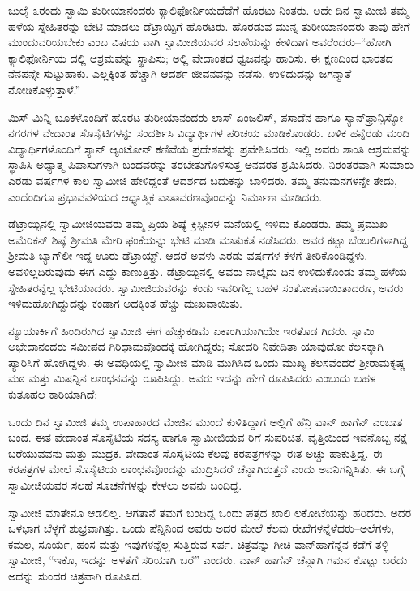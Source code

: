 ಜುಲೈ ೩ರಂದು ಸ್ವಾಮಿ ತುರೀಯಾನಂದರು ಕ್ಯಾಲಿಫೋರ್ನಿಯದೆಡೆಗೆ ಹೊರಟು ನಿಂತರು. ಅದೇ ದಿನ ಸ್ವಾಮೀಜಿ ತಮ್ಮ ಹಳೆಯ ಸ್ನೇಹಿತರನ್ನು ಭೇಟಿ ಮಾಡಲು ಡೆಟ್ರಾಯ್ಟಿಗೆ ಹೊರಟರು. ಹೊರಡುವ ಮುನ್ನ ತುರೀಯಾನಂದರು ತಾವು ಹೇಗೆ ಮುಂದುವರಿಯಬೇಕು ಎಂಬ ವಿಷಯ ವಾಗಿ ಸ್ವಾಮೀಜಿಯವರ ಸಲಹೆಯನ್ನು ಕೇಳಿದಾಗ ಅವರೆಂದರು–“ಹೋಗಿ ಕ್ಯಾಲಿಫೋರ್ನಿಯ ದಲ್ಲಿ ಆಶ್ರಮವನ್ನು ಸ್ಥಾಪಿಸು; ಅಲ್ಲಿ ವೇದಾಂತದ ಧ್ವಜವನ್ನು ಹಾರಿಸು. ಈ ಕ್ಷಣದಿಂದ ಭಾರತದ ನೆನಪನ್ನೇ ಸುಟ್ಟುಹಾಕು. ಎಲ್ಲಕ್ಕಿಂತ ಹೆಚ್ಚಾಗಿ ಆದರ್ಶ ಜೀವನವನ್ನು ನಡೆಸು. ಉಳಿದುದನ್ನು ಜಗನ್ಮಾತೆ ನೋಡಿಕೊಳ್ಳುತ್ತಾಳೆ.”

ಮಿಸ್ ಮಿನ್ನಿ ಬೂಕಳೊಂದಿಗೆ ಹೊರಟ ತುರೀಯಾನಂದರು ಲಾಸ್ ಏಂಜಲಿಸ್, ಪಸಾಡೆನ ಹಾಗೂ ಸ್ಯಾನ್​ಫ್ರಾನ್ಸಿಸ್ಕೋ ನಗರಗಳ ವೇದಾಂತ ಸೊಸೈಟಿಗಳನ್ನು ಸಂದರ್ಶಿಸಿ ವಿದ್ಯಾರ್ಥಿಗಳ ಪರಿಚಯ ಮಾಡಿಕೊಂಡರು. ಬಳಿಕ ಹನ್ನೆರಡು ಮಂದಿ ವಿದ್ಯಾರ್ಥಿಗಳೊಂದಿಗೆ ಸ್ಯಾನ್ ಆ್ಯಂಟೋನ್ ಕಣಿವೆಯ ಪ್ರದೇಶವನ್ನು ಪ್ರವೇಶಿಸಿದರು. ಇಲ್ಲಿ ಅವರು ಶಾಂತಿ ಆಶ್ರಮವನ್ನು ಸ್ಥಾಪಿಸಿ ಅಧ್ಯಾತ್ಮ ಪಿಪಾಸುಗಳಾಗಿ ಬಂದವರನ್ನು ತರಬೇತುಗೊಳಿಸುತ್ತ ಅನವರತ ಶ್ರಮಿಸಿದರು. ನಿರಂತರವಾಗಿ ಸುಮಾರು ಎರಡು ವರ್ಷಗಳ ಕಾಲ ಸ್ವಾಮೀಜಿ ಹೇಳಿದ್ದಂತೆ ಆದರ್ಶದ ಬದುಕನ್ನು ಬಾಳಿದರು. ತಮ್ಮ ತನುಮನಗಳನ್ನೇ ತೇದು, ಎಂದೆಂದಿಗೂ ಪ್ರಭಾವವಳಿಯದ ಆಧ್ಯಾತ್ಮಿಕ ವಾತಾವರಣವೊಂದನ್ನು ನಿರ್ಮಾಣ ಮಾಡಿದರು.

ಡೆಟ್ರಾಯ್ಟಿನಲ್ಲಿ ಸ್ವಾಮೀಜಿಯವರು ತಮ್ಮ ಪ್ರಿಯ ಶಿಷ್ಯೆ ಕ್ರಿಸ್ಟೀನಳ ಮನೆಯಲ್ಲಿ ಇಳಿದು ಕೊಂಡರು. ತಮ್ಮ ಪ್ರಮುಖ ಅಮೆರಿಕನ್ ಶಿಷ್ಯೆ ಶ್ರೀಮತಿ ಮೇರಿ ಫಂಕೆಯನ್ನು ಭೇಟಿ ಮಾಡಿ ಮಾತುಕತೆ ನಡೆಸಿದರು. ಅವರ ಕಟ್ಟಾ ಬೆಂಬಲಿಗಳಾಗಿದ್ದ ಶ್ರೀಮತಿ ಬ್ಯಾಗ್​ಲೀ ಇದ್ದ ಊರು ಡೆಟ್ರಾಯ್ಟ್. ಆದರೆ ಅವಳು ಎರಡು ವರ್ಷಗಳ ಕೆಳಗೆ ತೀರಿಕೊಂಡಿದ್ದಳು. ಅವಳಿಲ್ಲದಿರುವುದು ಈಗ ಎದ್ದು ಕಾಣುತ್ತಿತ್ತು. ಡೆಟ್ರಾಯ್ಟಿನಲ್ಲಿ ಅವರು ನಾಲ್ಕೈದು ದಿನ ಉಳಿದುಕೊಂಡು ತಮ್ಮ ಹಳೆಯ ಸ್ನೇಹಿತರನ್ನೆಲ್ಲ ಭೇಟಿಯಾದರು. ಸ್ವಾಮೀಜಿಯವರನ್ನು ಕಂಡು ಇವರಿಗೆಲ್ಲ ಬಹಳ ಸಂತೋಷವಾಯಿತಾದರೂ, ಅವರು ಇಳಿದುಹೋಗಿದ್ದುದನ್ನು ಕಂಡಾಗ ಅದಕ್ಕಿಂತ ಹೆಚ್ಚು ದುಃಖವಾಯಿತು.

ನ್ಯೂಯಾರ್ಕಿಗೆ ಹಿಂದಿರುಗಿದ ಸ್ವಾಮೀಜಿ ಈಗ ಹೆಚ್ಚುಕಡಿಮೆ ಏಕಾಂಗಿಯಾಗಿಯೇ ಇರತೊಡ ಗಿದರು. ಸ್ವಾಮಿ ಅಭೇದಾನಂದರು ಸಮೀಪದ ಗಿರಿಧಾಮವೊಂದಕ್ಕೆ ಹೋಗಿದ್ದರು; ಸೋದರಿ ನಿವೇದಿತಾ ಯಾವುದೋ ಕೆಲಸಕ್ಕಾಗಿ ಪ್ಯಾರಿಸಿಗೆ ಹೋಗಿದ್ದಳು. ಈ ಅವಧಿಯಲ್ಲಿ ಸ್ವಾಮೀಜಿ ಮಾಡಿ ಮುಗಿಸಿದ ಒಂದು ಮುಖ್ಯ ಕೆಲಸವೆಂದರೆ ಶ್ರೀರಾಮಕೃಷ್ಣ ಮಠ ಮತ್ತು ಮಿಷನ್ನಿನ ಲಾಂಛನವನ್ನು ರೂಪಿಸಿದ್ದು. ಅವರು ಇದನ್ನು ಹೇಗೆ ರೂಪಿಸಿದರು ಎಂಬುದು ಬಹಳ ಕುತೂಹಲ ಕಾರಿಯಾಗಿದೆ:

ಒಂದು ದಿನ ಸ್ವಾಮೀಜಿ ತಮ್ಮ ಉಪಾಹಾರದ ಮೇಜಿನ ಮುಂದೆ ಕುಳಿತಿದ್ದಾಗ ಅಲ್ಲಿಗೆ ಹೆನ್ರಿ ವಾನ್ ಹಾಗೆನ್ ಎಂಬಾತ ಬಂದ. ಈತ ವೇದಾಂತ ಸೊಸೈಟಿಯ ಸದಸ್ಯ ಹಾಗೂ ಸ್ವಾಮೀಜಿಯವ ರಿಗೆ ಸುಪರಿಚಿತ. ವೃತ್ತಿಯಿಂದ ಇವನೊಬ್ಬ ನಕ್ಷೆ ಬರೆಯುವವನು ಮತ್ತು ಮುದ್ರಕ. ವೇದಾಂತ ಸೊಸೈಟಿಯ ಕೆಲವು ಕರಪತ್ರಗಳನ್ನು ಈತ ಅಚ್ಚು ಹಾಕುತ್ತಿದ್ದ. ಈ ಕರಪತ್ರಗಳ ಮೇಲೆ ಸೊಸೈಟಿಯ ಲಾಂಛನವೊಂದನ್ನು ಮುದ್ರಿಸಿದರೆ ಚೆನ್ನಾಗಿರುತ್ತದೆ ಎಂದು ಅವನಿಗನ್ನಿಸಿತು. ಈ ಬಗ್ಗೆ ಸ್ವಾಮೀಜಿಯವರ ಸಲಹೆ ಸೂಚನೆಗಳನ್ನು ಕೇಳಲು ಅವನು ಬಂದಿದ್ದ.

ಸ್ವಾಮೀಜಿ ಮಾತೇನೂ ಆಡಲಿಲ್ಲ. ಆಗತಾನೆ ತಮಗೆ ಬಂದಿದ್ದ ಒಂದು ಪತ್ರದ ಖಾಲಿ ಲಕೋಟೆಯನ್ನು ಹರಿದರು. ಅದರ ಒಳಭಾಗ ಬೆಳ್ಳಗೆ ಶುಭ್ರವಾಗಿತ್ತು. ಒಂದು ಪೆನ್ನಿನಿಂದ ಅವರು ಅದರ ಮೇಲೆ ಕೆಲವು ರೇಖೆಗಳನ್ನೆಳೆದರು–ಅಲೆಗಳು, ಕಮಲ, ಸೂರ್ಯ, ಹಂಸ ಮತ್ತು ಇವುಗಳನ್ನೆಲ್ಲ ಸುತ್ತಿರುವ ಸರ್ಪ. ಚಿತ್ರವನ್ನು ಗೀಚಿ ವಾನ್​ಹಾಗೆನ್ನನ ಕಡೆಗೆ ತಳ್ಳಿ ಸ್ವಾಮೀಜಿ, “ಇಕೊ, ಇದನ್ನು ಅಳತೆಗೆ ಸರಿಯಾಗಿ ಬರೆ” ಎಂದರು. ವಾನ್ ಹಾಗೆನ್ ಚೆನ್ನಾಗಿ ಗಮನ ಕೊಟ್ಟು ಬರೆದು ಅದನ್ನು ಸುಂದರ ಚಿತ್ರವಾಗಿ ರೂಪಿಸಿದ.

